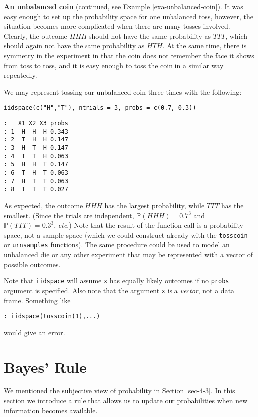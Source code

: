 \textbf{An unbalanced coin} (continued, see Example \ref{exa-unbalanced-coin}). It was
easy enough to set up the probability space for one unbalanced toss,
however, the situation becomes more complicated when there are many
tosses involved. Clearly, the outcome \(HHH\) should not have the same
probability as \(TTT\), which should again not have the same
probability as \(HTH\). At the same time, there is symmetry in the
experiment in that the coin does not remember the face it shows from
toss to toss, and it is easy enough to toss the coin in a similar way
repeatedly.

We may represent tossing our unbalanced coin three times with the following: 

\begin{verbatim}
iidspace(c("H","T"), ntrials = 3, probs = c(0.7, 0.3)) 
\end{verbatim}

\begin{verbatim}
:   X1 X2 X3 probs
: 1  H  H  H 0.343
: 2  T  H  H 0.147
: 3  H  T  H 0.147
: 4  T  T  H 0.063
: 5  H  H  T 0.147
: 6  T  H  T 0.063
: 7  H  T  T 0.063
: 8  T  T  T 0.027
\end{verbatim}

As expected, the outcome \(HHH\) has the largest probability, while
\(TTT\) has the smallest. (Since the trials are independent,
\(\mathbb{P}(HHH)=0.7^{3}\) and \(\mathbb{P}(TTT)=0.3^{3}\), \emph{etc}.)
Note that the result of the function call is a probability space, not
a sample space (which we could construct already with the \texttt{tosscoin}
or \texttt{urnsamples} functions). The same procedure could be used to model
an unbalanced die or any other experiment that may be represented with
a vector of possible outcomes.



Note that \texttt{iidspace} will assume \texttt{x} has equally likely outcomes if no
\texttt{probs} argument is specified. Also note that the argument \texttt{x} is a
\emph{vector}, not a data frame. Something like 
\begin{verbatim}
: iidspace(tosscoin(1),...)
\end{verbatim}
would give an error.

\section{Bayes' Rule}
\label{sec-4-8}

We mentioned the subjective view of probability in Section
\ref{sec-4-3}. In this section we introduce a rule that
allows us to update our probabilities when new information becomes
available.

